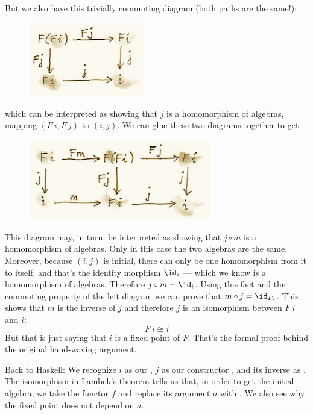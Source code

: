 \noindent
But we also have this trivially commuting diagram (both paths are the
same!):

\begin{figure}[H]
\centering
\includegraphics[width=50mm]{images/alg3.png}
\end{figure}

\noindent
which can be interpreted as showing that $j$ is a homomorphism of
algebras, mapping $(F\ i, F\ j)$ to $(i, j)$. We can
glue these two diagrams together to get:

\begin{figure}[H]
\centering
\includegraphics[width=80mm]{images/alg4.png}
\end{figure}

\noindent
This diagram may, in turn, be interpreted as showing that
$j \circ m$ is a homomorphism of algebras. Only in this case the
two algebras are the same. Moreover, because $(i, j)$ is
initial, there can only be one homomorphism from it to itself, and
that's the identity morphism $\id_i$ --- which we know is a
homomorphism of algebras. Therefore $j \circ m = \id_i$. Using this
fact and the commuting property of the left diagram we can prove that
$m \circ j = \id_{Fi}$. This shows that $m$ is the inverse of
$j$ and therefore $j$ is an isomorphism between
$F\ i$ and $i$:
\[F\ i \cong i\]
But that is just saying that $i$ is a fixed point of $F$.
That's the formal proof behind the original hand-waving argument.

Back to Haskell: We recognize $i$ as our ,
$j$ as our constructor , and its inverse as
. The isomorphism in Lambek's theorem tells us that, in
order to get the initial algebra, we take the functor $f$ and
replace its argument $a$ with . We also see why
the fixed point does not depend on $a$.

